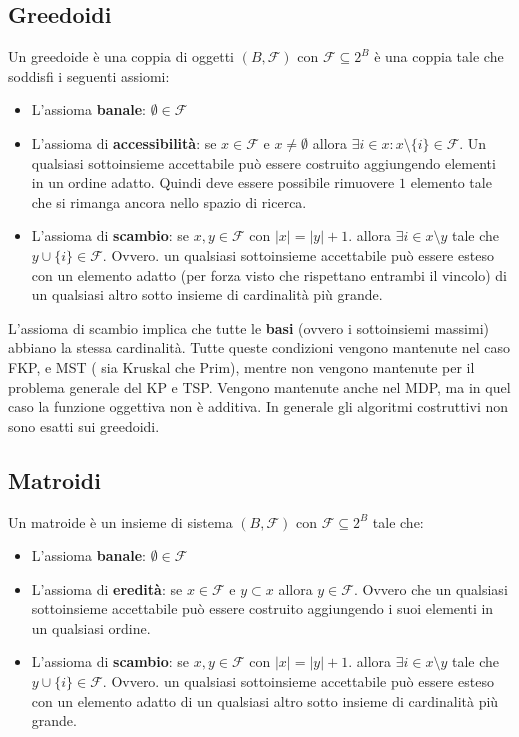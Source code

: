 \documentclass{article}
\begin{document}
    \subsection{Greedoidi}
    Un greedoide è una coppia di oggetti $(B,\mathcal{F})$ con
$\mathcal{F}\subseteq 2^B$ è una coppia tale che soddisfi i seguenti assiomi:
    \begin{itemize}
        \item L'assioma \textbf{banale}: $\emptyset\in\mathcal{F}$
        \item L'assioma di \textbf{accessibilità}: se $x\in\mathcal{F}$ e $x\neq\emptyset$ allora
              $\exists i\in x:x\setminus\{i\}\in\mathcal{F}$. Un qualsiasi sottoinsieme accettabile può
              essere costruito aggiungendo elementi in un ordine adatto. Quindi deve essere possibile
              rimuovere $1$ elemento tale che si rimanga ancora nello spazio di ricerca.
        \item L'assioma di \textbf{scambio}: se $x,y\in\mathcal{F}$ con $|x|=|y|+1$. allora $\exists i\in x\setminus y$
              tale che $y\cup\{i\}\in\mathcal{F}$. Ovvero. un qualsiasi sottoinsieme accettabile può
              essere esteso con un elemento adatto (per forza visto che rispettano entrambi il vincolo)
              di un qualsiasi altro sotto insieme di cardinalità più grande.
    \end{itemize}
    L'assioma di scambio implica che tutte le \textbf{basi} (ovvero i sottoinsiemi massimi)
    abbiano la stessa cardinalità. Tutte queste condizioni vengono mantenute nel caso FKP, e MST (
    sia Kruskal che Prim), mentre non vengono mantenute per il problema generale del KP e TSP.
    Vengono mantenute anche nel MDP, ma in quel caso la funzione oggettiva non è additiva. In generale
    gli algoritmi costruttivi non sono esatti sui greedoidi.


    \subsection{Matroidi}
    Un matroide è un insieme di sistema $(B,\mathcal{F})$ con $\mathcal{F}\subseteq 2^B$ tale che:
    \begin{itemize}
        \item L'assioma \textbf{banale}: $\emptyset\in\mathcal{F}$
        \item L'assioma di \textbf{eredità}: se $x\in\mathcal{F}$ e $y\subset x$ allora $y\in\mathcal{F}$. Ovvero
              che un qualsiasi sottoinsieme accettabile può essere costruito aggiungendo i suoi elementi
              in un qualsiasi ordine.
        \item L'assioma di \textbf{scambio}: se $x,y\in\mathcal{F}$ con $|x|=|y|+1$. allora $\exists i\in x\setminus y$
              tale che $y\cup\{i\}\in\mathcal{F}$. Ovvero. un qualsiasi sottoinsieme accettabile può
              essere esteso con un elemento adatto di un qualsiasi altro sotto insieme di cardinalità
              più grande.
    \end{itemize}
\end{document}
